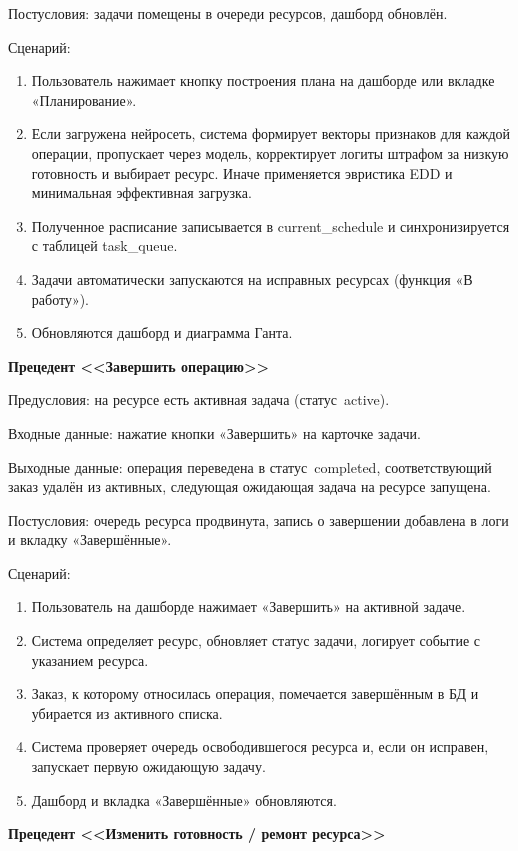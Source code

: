 Постусловия: задачи помещены в очереди ресурсов, дашборд обновлён.

Сценарий:

\begin{enumerate}
\item Пользователь нажимает кнопку построения плана на дашборде или вкладке «Планирование».
\item Если загружена нейросеть, система формирует векторы признаков для каждой операции, пропускает через модель, корректирует логиты штрафом за низкую готовность и выбирает ресурс. Иначе применяется эвристика EDD и минимальная эффективная загрузка.
\item Полученное расписание записывается в current\_schedule и синхронизируется с таблицей task\_queue.
\item Задачи автоматически запускаются на исправных ресурсах (функция «В работу»).
\item Обновляются дашборд и диаграмма Ганта.
\end{enumerate}

\textbf{Прецедент <<Завершить операцию>>}

Предусловия: на ресурсе есть активная задача (статус active).

Входные данные: нажатие кнопки «Завершить» на карточке задачи.

Выходные данные: операция переведена в статус completed, соответствующий заказ удалён из активных, следующая ожидающая задача на ресурсе запущена.

Постусловия: очередь ресурса продвинута, запись о завершении добавлена в логи и вкладку «Завершённые».

Сценарий:

\begin{enumerate}
\item Пользователь на дашборде нажимает «Завершить» на активной задаче.
\item Система определяет ресурс, обновляет статус задачи, логирует событие с указанием ресурса.
\item Заказ, к которому относилась операция, помечается завершённым в БД и убирается из активного списка.
\item Система проверяет очередь освободившегося ресурса и, если он исправен, запускает первую ожидающую задачу.
\item Дашборд и вкладка «Завершённые» обновляются.
\end{enumerate}

\textbf{Прецедент <<Изменить готовность / ремонт ресурса>>}

